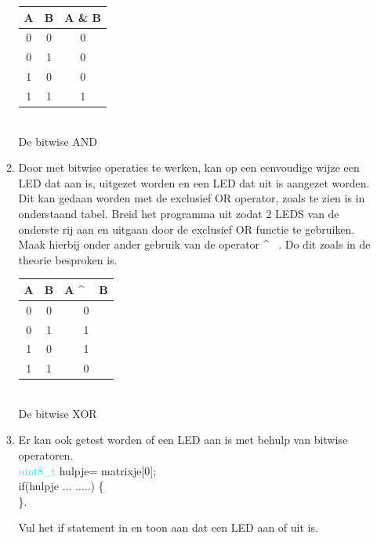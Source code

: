 \begin{enumerate}
\begin{enumerate}
	\setlength\arrayrulewidth{2pt}
	\begin{tabular}{|c|c|c|}
		\hline
		\rowcolor{yellow}
		A  & B     & A \& B       \\ \hline          
		0  & 0     & 0       \\ \hline
		0      & 1     & 0       \\ \hline
		1     & 0     & 0       \\ \hline
		1    & 1     & 1       \\ \hline
	\end{tabular}\\
	De bitwise AND 
	\item Door met bitwise operaties te werken, kan op een eenvoudige wijze een LED dat aan is, uitgezet worden en een LED dat uit is aangezet worden. Dit kan gedaan worden met de exclusief OR operator, zoals te zien is in onderstaand tabel. 
	Breid het programma uit zodat 2 LEDS van de onderste rij aan en uitgaan door de exclusief OR functie te gebruiken. Maak hierbij onder ander gebruik van de operator \^ ~. Do dit zoals in de theorie besproken is.
	
	\setlength\arrayrulewidth{2pt}
	\begin{tabular}{|c|c|c|}
		\hline
		\rowcolor{yellow}
		A  & B     & A \^ ~ B       \\ \hline          
		0  & 0     & 0       \\ \hline
		0      & 1     & 1       \\ \hline
		1     & 0     & 1      \\ \hline
		1    & 1     & 0       \\ \hline
	\end{tabular}\\
	De bitwise XOR 
	
	\item Er kan ook getest worden of een LED aan is met behulp van bitwise operatoren.\\	\textcolor{cyan}{uint8\_t} hulpje= matrixje[0];\\
	\textcolor{OliveGreen}{if}(hulpje ...  .....) \{ \\
\}.

Vul het \textcolor{arduinoGreen}{if} statement in en toon aan dat een LED aan of uit is.
 \end{enumerate}


\end{enumerate}
